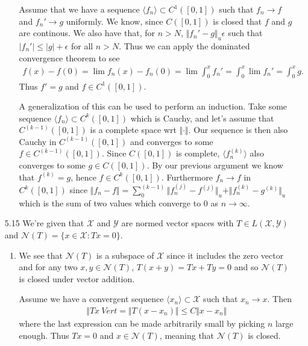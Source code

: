 \documentclass[11pt,letter]{article}
\begin{document}
\begin{enumerate}
\begin{enumerate}
    Assume that we have a sequence $\langle f_n \rangle \subset C^1([0,1])$ such that $f_n \rightarrow f$ and $f_n' \rightarrow g$ uniformly. We know, since $C([0,1])$ is closed that $f$ and $g$ are continous. We also have that, for $n > N$, $\Vert f_n' - g \Vert_u \epsilon$ such that $\vert f_n' \vert \le \vert g \vert + \epsilon$ for all $n > N$. Thus we can apply the dominated convergence theorem to see
    \begin{align*}
        f(x) - f(0) = \lim f_n(x) - f_n(0) = \lim \int_0^x f_n' = \int_0^x \lim f_n' = \int_0^x g.
    \end{align*}
    Thus $f' = g$ and $f \in C^1([0,1])$. 
    
    A generalization of this can be used to perform an induction. Take some sequence $\langle f_n \rangle \subset C^k([0,1])$ which is Cauchy, and let's assume that $C^{(k-1)}([0,1])$ is a complete space wrt $\Vert \cdot \Vert$. Our sequence is then also Cauchy in $C^{(k-1)}([0,1])$ and converges to some $f \in C^{(k-1)}([0,1])$. Since $C([0,1])$ is complete, $\langle f_n^{(k)} \rangle$ also converges to some $g \in C([0,1])$. By our previous argument we know that $f^{(k)} = g$, hence $f \in C^k([0,1])$. Furthermore $f_n \rightarrow f$ in $C^k([0,1])$ since $\Vert f_n - f \Vert = \sum_0^{(k-1)} \Vert f_n^{(j)} - f^{(j)} \Vert_u + \Vert f_n^{(k)} - g^{(k)} \Vert_u$ which is the sum of two values which converge to 0 as $n \rightarrow \infty$.
    \end{enumerate}

    \newpage

    \item [5.15] We're given that $\mathcal{X}$ and $\mathcal{Y}$ are normed vector spaces with $T \in L(\mathcal{X},\mathcal{Y})$ and $\mathcal{N}(T) = \{x \in \mathcal{X}: Tx = 0\}$.
    
    \begin{enumerate} 
        \item We see that $\mathcal{N}(T)$ is a subspace of $\mathcal{X}$ since it includes the zero vector and for any two $x,y \in \mathcal{N}(T)$, $T(x+y) = Tx+Ty = 0$ and so $\mathcal{N}(T)$ is closed under vector addition.
        
        Assume we have a convergent sequence $\langle x_n \rangle \subset \mathcal{X}$ such that $x_n \rightarrow x$. Then
        \begin{align*}
            \Vert Tx \ Vert = \Vert T(x - x_n) \Vert \le C \Vert x - x_n \Vert
        \end{align*}
        where the last expression can be made arbitrarily small by picking $n$ large enough. Thus $Tx = 0$ and $x \in \mathcal{N}(T)$, meaning that $\mathcal{N}(T)$ is closed.


\end{enumerate}
\end{enumerate}
\end{document}
